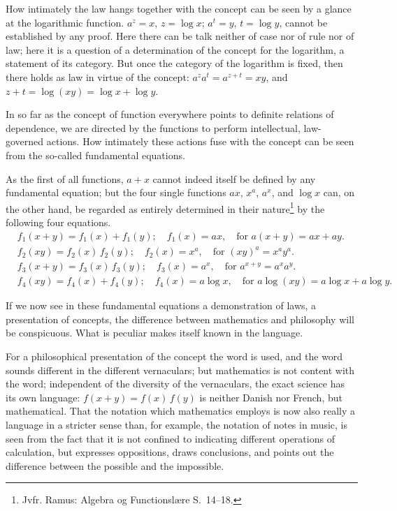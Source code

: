 \documentclass[12pt]{book}
\begin{document}
How intimately the law hangs together with the concept can be seen by a glance
at the logarithmic function. $a^{z} = x$, $z = \log x$; $a^{t} = y$,
$t = \log y$, cannot be established by any proof. Here there can be talk neither
of case nor of rule nor of law; here it is a question of
a determination of the concept for the logarithm, a statement of its category.
But once the category of the logarithm is fixed, then there holds as law in
virtue of the concept: $a^{z}a^{t} = a^{z+t} = xy$, and
$z+t = \log(xy) = \log x + \log y$.

In so far as the concept of function everywhere points to definite relations of
dependence, we are directed by the functions to perform intellectual,
law-governed actions. How intimately these actions fuse with the concept can be
seen from the so-called fundamental equations.

As the first of all functions, $a+x$ cannot indeed itself be defined by any
fundamental equation; but the four single functions $ax$, $x^{a}$, $a^{x}$, and
$\log x$ can, on the other hand, be regarded as entirely determined in their
nature\footnote{Jvfr. Ramus: Algebra og Functionslære S.\ 14--18.} by the
following four equations.
\[
\begin{aligned}
&f_{1}(x+y) = f_{1}(x) + f_{1}(y); \quad f_{1}(x) = ax,
      \quad \text{for } a(x+y) = ax + ay.\\[2pt]
&f_{2}(xy) = f_{2}(x)\,f_{2}(y); \quad f_{2}(x) = x^{a},
      \quad \text{for } (xy)^{a} = x^{a}y^{a}.\\[2pt]
&f_{3}(x+y) = f_{3}(x)\,f_{3}(y); \quad f_{3}(x) = a^{x},
      \quad \text{for } a^{x+y} = a^{x}a^{y}.\\[2pt]
&f_{4}(xy) = f_{4}(x) + f_{4}(y); \quad f_{4}(x) = a\log x,
      \quad \text{for } a\log(xy) = a\log x + a\log y.
\end{aligned}
\]

If we now see in these fundamental equations a demonstration of laws, a
presentation of concepts, the difference between mathematics and philosophy will
be conspicuous. What is peculiar makes itself known in the language.

For a philosophical presentation of the concept the word is used, and the word
sounds different in the different vernaculars; but mathematics is not content
with the word; independent of the diversity of the vernaculars, the exact
science has its own language: $f(x+y) = f(x)\,f(y)$ is neither Danish nor French,
but mathematical.
That the notation which mathematics employs is now also really a language in a
stricter sense than, for example, the notation of notes in music, is seen from
the fact that it is not confined to indicating different operations of
calculation, but expresses oppositions, draws conclusions, and points out the
difference between the possible and the impossible.
\end{document}
